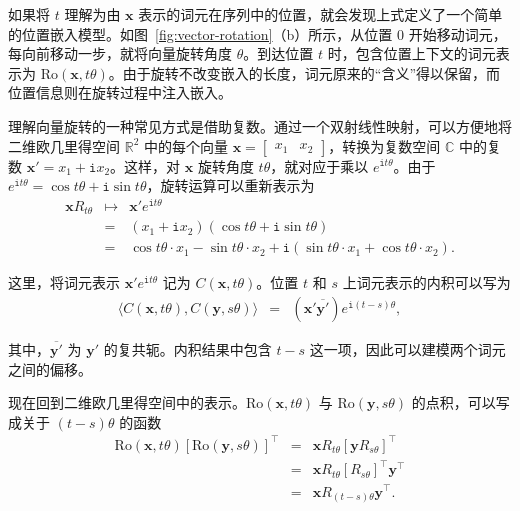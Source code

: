 如果将 $t$ 理解为由 $\mathbf{x}$ 表示的词元在序列中的位置，就会发现上式定义了一个简单的位置嵌入模型。如图~\ref{fig:vector-rotation}（b）所示，从位置 0 开始移动词元，每向前移动一步，就将向量旋转角度 $\theta$。到达位置 $t$ 时，包含位置上下文的词元表示为 $\mathrm{Ro}(\mathbf{x},t\theta)$。由于旋转不改变嵌入的长度，词元原来的“含义”得以保留，而位置信息则在旋转过程中注入嵌入。

理解向量旋转的一种常见方式是借助复数。通过一个双射线性映射，可以方便地将二维欧几里得空间 $\mathbb{R}^2$ 中的每个向量 $\mathbf{x} = \begin{bmatrix} x_1 & x_2 \end{bmatrix}$，转换为复数空间 $\mathbb{C}$ 中的复数 $\mathbf{x}' = x_1 + \mathtt{i} x_2$。这样，对 $\mathbf{x}$ 旋转角度 $t\theta$，就对应于乘以 $e^{\mathtt{i} t\theta}$。由于 $e^{\mathtt{i} t\theta} = \cos t \theta + \mathtt{i} \sin t \theta$，旋转运算可以重新表示为
\begin{eqnarray}
\mathbf{x} R_{t \theta} & \mapsto & \mathbf{x}' e^{\mathtt{i} t\theta} \nonumber \\
                        & =       & (x_1 + \mathtt{i} x_2) (\cos t \theta + \mathtt{i} \sin t \theta) \nonumber \\
                        & =       & \cos t \theta \cdot x_1 - \sin t \theta \cdot x_2 + \mathtt{i} (\sin t \theta \cdot x_1 + \cos t \theta \cdot x_2).
\end{eqnarray}

\noindent 这里，将词元表示 $\mathbf{x}' e^{\mathtt{i} t\theta}$ 记为 $C(\mathbf{x},t\theta)$。位置 $t$ 和 $s$ 上词元表示的内积可以写为
\begin{eqnarray}
\langle C(\mathbf{x},t\theta), C(\mathbf{y},s \theta) \rangle & = & (\mathbf{x}' \overline{\mathbf{y}'}) e^{\mathtt{i} (t - s) \theta} \label{eq:rope-inner-product},
\end{eqnarray}

\noindent 其中，$\overline{\mathbf{y}'}$ 为 $\mathbf{y}'$ 的复共轭。内积结果中包含 $t - s$ 这一项，因此可以建模两个词元之间的偏移。

现在回到二维欧几里得空间中的表示。$\mathrm{Ro}(\mathbf{x},t\theta)$ 与 $\mathrm{Ro}(\mathbf{y},s\theta)$ 的点积，可以写成关于 $(t - s)\theta$ 的函数
\begin{eqnarray}
\mathrm{Ro}(\mathbf{x},t\theta) [\mathrm{Ro}(\mathbf{y},s\theta)]^\top & = & \mathbf{x} R_{t \theta} [\mathbf{y} R_{s \theta}]^\top \nonumber \\
                                                                               & = & \mathbf{x} R_{t \theta} [R_{s \theta}]^\top \mathbf{y}^\top \nonumber \\
                                                                               & = & \mathbf{x} R_{(t - s) \theta} \mathbf{y}^\top.
\end{eqnarray}

